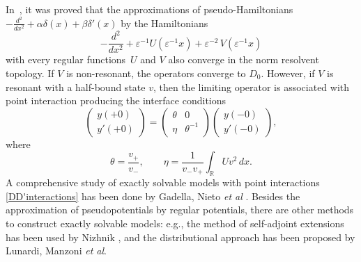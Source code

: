 \documentclass[reqno]{amsart}
\theoremstyle{definition}
\theoremstyle{remark}
\numberwithin{equation}{section}
\newcommand{\Real}{\mathbb R}
\newcommand{\eps}{\varepsilon}
\begin{document}
In~\cite{GolovatyMFAT2012, GolovatyIEOT2012},
it was proved that the approximations of pseudo-Hamiltonians $ - \frac{d^2}{dx^2}+\alpha \delta(x)+ \beta \delta'(x)$ by the Hamiltonians
\begin{equation*}
   -\frac{d^2}{dx^2}+ \eps^{-1} U(\eps^{-1}x)+\eps^{-2}\,V(\eps^{-1}x)
\end{equation*}
with every regular functions~$U$ and $V$ also converge in the norm resolvent topology. If $V$ is non-resonant, the operators converge to $D_0$. However, if $V$ is reso\-nant with a half-bound state $v$, then the limiting operator is associated with point interaction producing the interface conditions
\begin{equation}\label{DD'interactions}
\begin{pmatrix}
    y(+0)\\y'(+0)
\end{pmatrix}=
\begin{pmatrix}
  \theta& 0\\
  \eta & \theta^{-1}
\end{pmatrix}
\begin{pmatrix}
    y(-0)\\y'(-0)
\end{pmatrix},
\end{equation}
where
\begin{equation}\label{ThetaEta}
 \theta = \frac{v_+}{v_-}, \qquad \eta=\frac1{v_-v_+}\int_{\Real} Uv^2\,dx.
\end{equation}
A comprehensive study of exactly solvable models with point interactions \eqref{DD'interactions} has been done by Gadella, Nieto  \textit{et al} \cite{GadellaHerasNietoas2009, GadellaNegroNieto2009, GadellaGlasserNieto2011}. Besides the approximation of pseudo\-potentials by regular potentials, there are other methods to construct exactly solvable models: e.g., the method of self-adjoint extensions has been used by Nizhnik \cite{NizhFAA2003, NizhFAA2006}, and the distributional approach has been proposed by Lunardi, Manzoni \textit{et al}\cite{LunardiManzoni2014, LunardiManzoni2016}.
\end{document}
